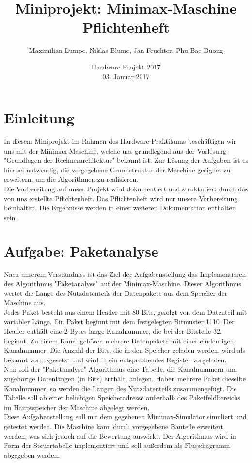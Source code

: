 \documentclass[12pt,titlepage,german,a4]{article}
\begin{document}
    \title{\bf Miniprojekt: Minimax-Maschine \\ Pflichtenheft}
    \date{Hardware Projekt 2017 \\ 03. Januar 2017}
    \author{Maximilian Lumpe, Niklas Blume, Jan Feuchter, Phu Bac Duong}
    \maketitle

    \tableofcontents

    \newpage

    \section{Einleitung}
    In diesem Miniprojekt im Rahmen des Hardware-Praktikums besch{\"a}ftigen wir uns mit der Minimax-Maschine, welche uns grundlegend aus der Vorlesung "Grundlagen der Rechnerarchitektur" bekannt ist. Zur L{\"o}sung der Aufgaben ist es hierbei notwendig, die vorgegebene Grundstruktur der Maschine geeignet zu erweitern, um die Algorithmen zu realisieren.\\Die Vorbereitung auf unser Projekt wird dokumentiert und strukturiert durch das von uns erstellte Pflichtenheft. Das Pflichtenheft wird nur unsere Vorbereitung beinhalten. Die Ergebnisse werden in einer weiteren Dokumentation enthalten sein.

    \section{Aufgabe: Paketanalyse}
    Nach unserem Verst{\"a}ndniss ist das Ziel der Aufgabenstellung das Implementieren des Algorithmus "Paketanalyse" auf der Minimax-Maschine. Dieser Algorithmus wertet die L{\"a}nge des Nutzdatenteils der Datenpakete aus dem Speicher der Maschine aus.\\Jedes Paket besteht aus einem Header mit 80 Bits, gefolgt von dem Datenteil mit variabler L{\"a}nge. Ein Paket beginnt mit dem festgelegten Bitmuster 1110. Der Header enth{\"a}lt eine 2 Bytes lange Kanalnummer, die bei der Bitstelle 32. beginnt. Zu einem Kanal geh{\"o}ren mehrere Datenpakete mit einer eindeutigen Kanalnummer. Die Anzahl der Bits, die in den Speicher geladen werden, wird als bekannt vorausgesetzt und wird in ein entsprechendes Register vorgeladen.\\Nun soll der "Paketanalyse"-Algorithmus eine Tabelle, die Kanalnummern und zugeh{\"o}rige Datenl{\"a}ngen (in Bits) enth{\"a}lt, anlegen. Haben mehrere Paket dieselbe Kanalnummer, so werden die L{\"a}ngen des Nutzdatenteils zusammengef{\"u}gt. Die Tabelle soll ab einer beliebigen Speicheradresse au{\ss}erhalb des Paketfeldbereichs im Hauptspeicher der Maschine abgelegt werden.\\Diese Aufgabenstellung soll mit dem gegebenen Minimax-Simulator simuliert und getestet werden. Die Maschine kann durch vorgegebene Bauteile erweitert werden, was sich jedoch auf die Bewertung auswirkt. Der Algorithmus wird in Form der Steuertabelle implementiert und soll au{\ss}erdem als Flussdiagramm abgegeben werden.
\end{document}
